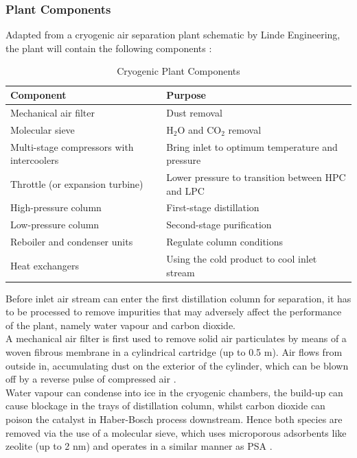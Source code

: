 	\subsubsection{Plant Components} \noindent
    Adapted from a cryogenic air separation plant schematic by Linde Engineering, the plant will contain the following components \citep{linde_cryo}:
    \begin{table}[ht]
        \singlespacing
    	\centering
	    \caption{Cryogenic Plant Components}
	    \label{table:plant_components}

	    \begin{tabular}{|l|l|}
	    \hline
	    Component						& Purpose \\        \hline
	    Mechanical air filter 			& Dust removal \\
	    Molecular sieve					& H$_2$O and CO$_2$ removal \\
	    Multi-stage compressors with intercoolers & Bring inlet to optimum temperature and pressure\\
	    Throttle (or expansion turbine)	& Lower pressure to transition between HPC and LPC\\
	    High-pressure column			& First-stage distillation \\
	    Low-pressure column				& Second-stage purification \\
	    Reboiler and condenser units	& Regulate column conditions\\
	    Heat exchangers					& Using the cold product to cool inlet stream \\  \hline
	    \end{tabular}
    \end{table}
        Before inlet air stream can enter the first distillation column for separation, it has to be processed to remove impurities that may adversely affect the performance of the plant, namely water vapour and carbon dioxide. \\
        A mechanical air filter is first used to remove solid air particulates by means of a woven fibrous membrane in a cylindrical cartridge (up to 0.5 \textmu m). Air flows from outside in, accumulating dust on the exterior of the cylinder, which can be blown off by a reverse pulse of compressed air \citep{airfilter}.\\
        Water vapour can condense into ice in the cryogenic chambers, the build-up can cause blockage in the trays of distillation column, whilst carbon dioxide can poison the catalyst in Haber-Bosch process downstream. Hence both species are removed via the use of a molecular sieve, which uses microporous adsorbents like zeolite (up to 2 nm) and operates in a similar manner as PSA \citep{white2017}.

